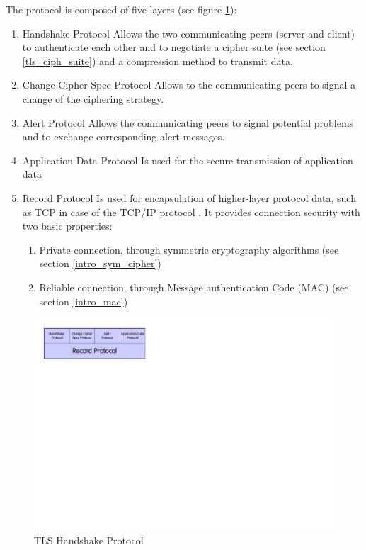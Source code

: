 The protocol is composed of five layers (see figure
\ref{fig:tls_handshake}):

\begin{enumerate}[noitemsep]
  \item Handshake Protocol\newline
  Allows the two communicating peers (server and client) to
authenticate each other and to negotiate a cipher suite (see section
\ref{tls_ciph_suite}) and a compression method to transmit data.
  \item Change Cipher Spec Protocol\newline
  Allows to the communicating peers to signal a change of the ciphering
  strategy.
  \item Alert Protocol\newline
  Allows the communicating peers to signal potential problems and to exchange
  corresponding alert messages.
  \item Application Data Protocol\newline
  Is used for the secure transmission of application data
  \item Record Protocol\newline
  Is used for encapsulation of higher-layer protocol data,
such as TCP in case of the TCP/IP protocol \cite{RFC0793}.
It provides connection security with two basic properties:
\begin{enumerate}[noitemsep]
  \item Private connection, through symmetric cryptography algorithms (see
  section \ref{intro_sym_cipher})
  \item Reliable connection, through Message authentication Code (MAC) (see
  section \ref{intro_mac}) 
\end{enumerate}
\end{enumerate}

\begin{figure}[!ht]
\centering
\includegraphics[trim=0cm 17cm 18cm 0cm]{figures/tls_handshake.pdf}
\caption{TLS Handshake Protocol}
\label{fig:tls_handshake}
\end{figure}


